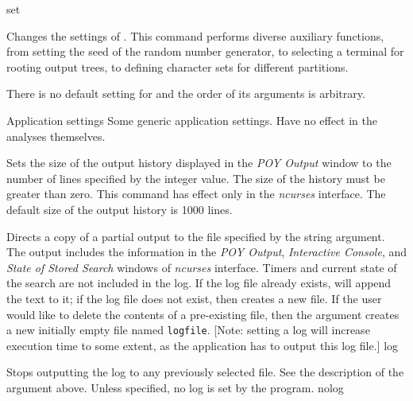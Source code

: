 \begin{command}{set}{}


\begin{poydescription}
Changes the settings of \poy. This command performs diverse auxiliary 
functions, from setting the seed of the random number generator, to
selecting a terminal for rooting output trees, to defining character sets
for different partitions.

There is no default setting for  and the order of its
arguments is arbitrary.

\end{poydescription}

\begin{arguments}

\begin{argumentgroup}{Application settings}
{Some generic application settings. Have no effect in the analyses
themselves.}

{Sets the size of the \poy output history displayed in the
\emph{POY Output} window to the number of lines specified by the
integer value. The size of the history must be greater than
zero. This command has effect only in the \emph{ncurses} interface. The
default size of the output history is 1000 lines.}
{}

{Directs a copy of a partial output to the file specified by the
string argument. The output includes the information in the
\emph{POY Output}, \emph{Interactive Console}, and \emph{State
of Stored Search} windows of \emph{ncurses} interface. Timers and
current state of the search are not included in the log. If the
log file already exists, \poy will append the text to it; if the log
file does not exist, then \poy creates a new file. If the user
would like to delete the contents of a pre-existing file, then
the argument  creates a new
initially empty file named \texttt{logfile}. [Note: setting a log will 
increase execution time to some extent, as the application has
to output this log file.]}
{log}

{Stops outputting the log to any previously selected
file. See the description of the argument 
above. Unless specified, no log is set by the program.}
{nolog}



\end{argumentgroup}
\end{arguments}
\end{command}
